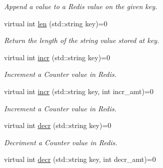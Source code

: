 \begin{DoxyCompactItemize}
\begin{DoxyCompactList}\small\item\em Append a value to a Redis value on the given key. \end{DoxyCompactList}\item 
\hypertarget{classRedisInterface_ad52034f760e2c197e1c34ff18f72dfc4}{virtual int \hyperlink{classRedisInterface_ad52034f760e2c197e1c34ff18f72dfc4}{len} (std\-::string key)=0}\label{classRedisInterface_ad52034f760e2c197e1c34ff18f72dfc4}

\begin{DoxyCompactList}\small\item\em Return the length of the string value stored at key. \end{DoxyCompactList}\item 
\hypertarget{classRedisInterface_a175deb36b92a98e497ee3d065d3327ea}{virtual int \hyperlink{classRedisInterface_a175deb36b92a98e497ee3d065d3327ea}{incr} (std\-::string key)=0}\label{classRedisInterface_a175deb36b92a98e497ee3d065d3327ea}

\begin{DoxyCompactList}\small\item\em Increment a Counter value in Redis. \end{DoxyCompactList}\item 
\hypertarget{classRedisInterface_a6299f2e405bb474333efc990c22b1765}{virtual int \hyperlink{classRedisInterface_a6299f2e405bb474333efc990c22b1765}{incr} (std\-::string key, int incr\-\_\-amt)=0}\label{classRedisInterface_a6299f2e405bb474333efc990c22b1765}

\begin{DoxyCompactList}\small\item\em Increment a Counter value in Redis. \end{DoxyCompactList}\item 
\hypertarget{classRedisInterface_a2147447af614a2c59f69a7b9ef3f5f2a}{virtual int \hyperlink{classRedisInterface_a2147447af614a2c59f69a7b9ef3f5f2a}{decr} (std\-::string key)=0}\label{classRedisInterface_a2147447af614a2c59f69a7b9ef3f5f2a}

\begin{DoxyCompactList}\small\item\em Decriment a Counter value in Redis. \end{DoxyCompactList}\item 
\hypertarget{classRedisInterface_ac25ea101a43a9e6cf48d4b40009aedec}{virtual int \hyperlink{classRedisInterface_ac25ea101a43a9e6cf48d4b40009aedec}{decr} (std\-::string key, int decr\-\_\-amt)=0}\label{classRedisInterface_ac25ea101a43a9e6cf48d4b40009aedec}


\end{DoxyCompactItemize}
